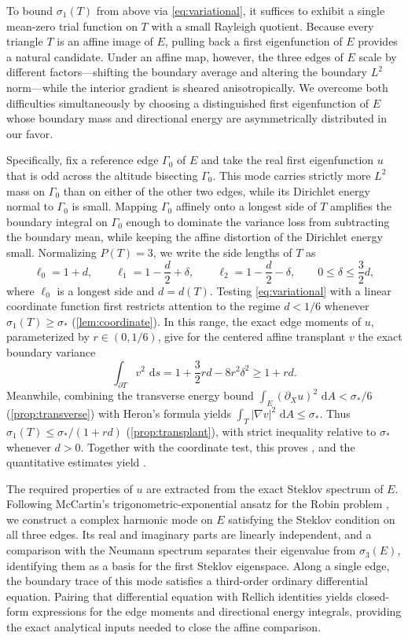 \documentclass[11pt,reqno]{amsart}
\numberwithin{equation}{section}
\theoremstyle{remark}
\newcommand{\dd}{\,\mathrm d}
\begin{document}
To bound $\sigma_1(T)$ from above via \eqref{eq:variational}, it suffices to exhibit a single mean-zero trial function on $T$ with a small Rayleigh quotient. Because every triangle $T$ is an affine image of $E$, pulling back a first eigenfunction of $E$ provides a natural candidate. Under an affine map, however, the three edges of $E$ scale by different factors---shifting the boundary average and altering the boundary $L^2$ norm---while the interior gradient is sheared anisotropically. We overcome both difficulties simultaneously by choosing a distinguished first eigenfunction of $E$ whose boundary mass and directional energy are asymmetrically distributed in our favor.

Specifically, fix a reference edge $\Gamma_0$ of $E$ and take the real first eigenfunction $u$ that is odd across the altitude bisecting $\Gamma_0$. This mode carries strictly more $L^2$ mass on $\Gamma_0$ than on either of the other two edges, while its Dirichlet energy normal to $\Gamma_0$ is small. Mapping $\Gamma_0$ affinely onto a longest side of $T$ amplifies the boundary integral on $\Gamma_0$ enough to dominate the variance loss from subtracting the boundary mean, while keeping the affine distortion of the Dirichlet energy small. Normalizing $P(T)=3$, we write the side lengths of $T$ as
\[
 \ell_0=1+d,\qquad \ell_1=1-\frac d2+\delta,\qquad
 \ell_2=1-\frac d2-\delta,\qquad 0\le\delta\le\frac32d,
\]
where $\ell_0$ is a longest side and $d=d(T)$. Testing \eqref{eq:variational} with a linear coordinate function first restricts attention to the regime $d<1/6$ whenever $\sigma_1(T)\ge\sigma_*$ (\cref{lem:coordinate}). In this range, the exact edge moments of $u$, parameterized by $r\in(0,1/6)$, give for the centered affine transplant $v$ the exact boundary variance
\[
 \int_{\partial T}v^2\,\dd s
 =1+\frac32rd-8r^2\delta^2\ge1+rd.
\]
Meanwhile, combining the transverse energy bound $\int_E(\partial_Xu)^2\,\dd A<\sigma_*/6$ (\cref{prop:transverse}) with Heron's formula yields $\int_T|\nabla v|^2\,\dd A\le\sigma_*$. Thus $\sigma_1(T)\le\sigma_*/(1+rd)$ (\cref{prop:transplant}), with strict inequality relative to $\sigma_*$ whenever $d>0$. Together with the coordinate test, this proves , and the quantitative estimates yield .

The required properties of $u$ are extracted from the exact Steklov spectrum of $E$. Following McCartin's trigonometric-exponential ansatz for the Robin problem \cite{McC}, we construct a complex harmonic mode on $E$ satisfying the Steklov condition on all three edges. Its real and imaginary parts are linearly independent, and a comparison with the Neumann spectrum separates their eigenvalue from $\sigma_3(E)$, identifying them as a basis for the first Steklov eigenspace. Along a single edge, the boundary trace of this mode satisfies a third-order ordinary differential equation. Pairing that differential equation with Rellich identities yields closed-form expressions for the edge moments and directional energy integrals, providing the exact analytical inputs needed to close the affine comparison.
\end{document}
